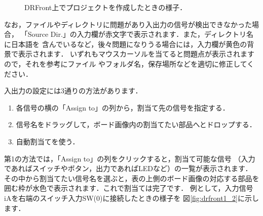 \begin{figure}[ht]
 \centering
 \caption{DRFront上でプロジェクトを作成したときの様子．}
 \label{fig:drfront1_1}
\end{figure}

なお，ファイルやディレクトリに問題があり入出力の信号が検出できなかった場合，
「Source Dir.」の入力欄が赤文字で表示されます．また，ディレクトリ名に日本語を
含んでいるなど，後々問題になりうる場合には，入力欄が黄色の背景で表示されます．
いずれもマウスカーソルを当てると問題点が表示されますので，それを参考にファイル
やフォルダ名，保存場所などを適切に修正してください．

入出力の設定には3通りの方法があります．
\begin{enumerate}
 \item 各信号の横の「Assign to」の列から，割当て先の信号を指定する．
 \item 信号名をドラッグして，ボード画像内の割当てたい部品へとドロップする．
 \item 自動割当てを使う．
\end{enumerate}

第1の方法では，「Assign to」の列をクリックすると，割当て可能な信号
（入力であればスイッチやボタン，出力であればLEDなど）の一覧が表示されます．
その中から割当てたい信号名を選ぶと，表の上側のボード画像の対応する部品を
囲む枠が水色で表示されます．これで割当ては完了です．
例として，入力信号iAを右端のスイッチ入力SW(0)に接続したときの様子を
図\ref{fig:drfront1_2}に示します．

